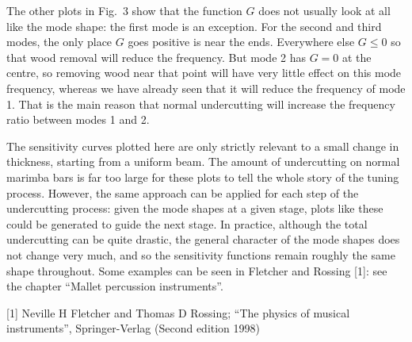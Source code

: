   The other plots in Fig.\ 3 show that the function $G$ does not usually look 
  at all like the mode shape: the first mode is an exception. For the second 
  and third modes, the only place $G$ goes positive is near the ends. 
  Everywhere else $G \le 0$ so that wood removal will reduce the frequency. But 
  mode 2 has $G=0$ at the centre, so removing wood near that point will have 
  very little effect on this mode frequency, whereas we have already seen that 
  it will reduce the frequency of mode 1. That is the main reason that normal 
  undercutting will increase the frequency ratio between modes 1 and 2. 

  The sensitivity curves plotted here are only strictly relevant to a small 
  change in thickness, starting from a uniform beam. The amount of undercutting 
  on normal marimba bars is far too large for these plots to tell the whole 
  story of the tuning process. However, the same approach can be applied for 
  each step of the undercutting process: given the mode shapes at a given 
  stage, plots like these could be generated to guide the next stage. In 
  practice, although the total undercutting can be quite drastic, the general 
  character of the mode shapes does not change very much, and so the 
  sensitivity functions remain roughly the same shape throughout. Some examples 
  can be seen in Fletcher and Rossing [1]: see the chapter ``Mallet percussion 
  instruments''. 



  \sectionreferences{}[1] Neville H Fletcher and Thomas D Rossing; ``The 
  physics of musical instruments'', Springer-Verlag (Second edition 1998) 